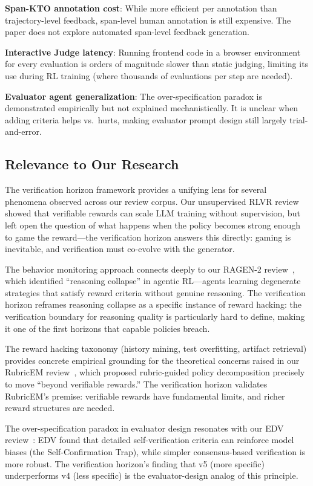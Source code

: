 \documentclass[11pt,a4paper]{article}
\begin{document}
\textbf{Span-KTO annotation cost}: While more efficient per annotation than trajectory-level feedback, span-level human annotation is still expensive. The paper does not explore automated span-level feedback generation.

\textbf{Interactive Judge latency}: Running frontend code in a browser environment for every evaluation is orders of magnitude slower than static judging, limiting its use during RL training (where thousands of evaluations per step are needed).

\textbf{Evaluator agent generalization}: The over-specification paradox is demonstrated empirically but not explained mechanistically. It is unclear when adding criteria helps vs.\ hurts, making evaluator prompt design still largely trial-and-error.

\subsection{Relevance to Our Research}

The verification horizon framework provides a unifying lens for several phenomena observed across our review corpus. Our unsupervised RLVR review~\cite{yuan2026rlvr} showed that verifiable rewards can scale LLM training without supervision, but left open the question of what happens when the policy becomes strong enough to game the reward---the verification horizon answers this directly: gaming is inevitable, and verification must co-evolve with the generator.

The behavior monitoring approach connects deeply to our RAGEN-2 review~\cite{chen2026ragen2}, which identified ``reasoning collapse'' in agentic RL---agents learning degenerate strategies that satisfy reward criteria without genuine reasoning. The verification horizon reframes reasoning collapse as a specific instance of reward hacking: the verification boundary for reasoning quality is particularly hard to define, making it one of the first horizons that capable policies breach.

The reward hacking taxonomy (history mining, test overfitting, artifact retrieval) provides concrete empirical grounding for the theoretical concerns raised in our RubricEM review~\cite{liu2026rubicem}, which proposed rubric-guided policy decomposition precisely to move ``beyond verifiable rewards.'' The verification horizon validates RubricEM's premise: verifiable rewards have fundamental limits, and richer reward structures are needed.

The over-specification paradox in evaluator design resonates with our EDV review~\cite{zhu2026edv}: EDV found that detailed self-verification criteria can reinforce model biases (the Self-Confirmation Trap), while simpler consensus-based verification is more robust. The verification horizon's finding that v5 (more specific) underperforms v4 (less specific) is the evaluator-design analog of this principle.
\end{document}
